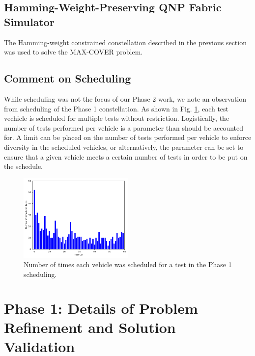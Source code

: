 \documentclass[aps,pra,twocolumn,superscriptaddress,groupedaddress]{revtex4}  %
\begin{document}
\subsection{Hamming-Weight-Preserving QNP Fabric Simulator}
The Hamming-weight constrained constellation described in the previous section
was used to solve the MAX-COVER problem.

\subsection{Comment on Scheduling}

While scheduling was not the focus of our Phase 2 work, we note an observation from
scheduling of the Phase 1 constellation. As shown in Fig. \ref{fig:freq}, each test
vechicle is scheduled for multiple tests without restriction. Logistically, the 
number of tests performed per vehicle is a parameter than should be accounted for. 
A limit can be placed on the number of tests performed per vehicle to enforce
diversity in the scheduled vehicles, or alternatively, the parameter can be set
to ensure that a given vehicle meets a certain number of tests in order to be put on
the schedule. 

\begin{figure}
\begin{center}
\includegraphics[width=0.5\textwidth]{figures/phase2/3-sched-frequency.pdf}
\caption{Number of times each vehicle was scheduled for a test in the Phase 1 scheduling.}
\label{fig:freq}
\end{center}
\end{figure}



\appendix
\newpage
\clearpage

\section{Phase 1: Details of Problem Refinement and Solution Validation}
\end{document}
